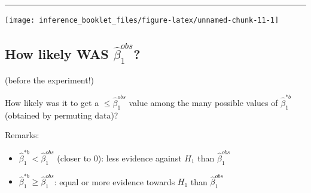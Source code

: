 \documentclass[]{article}
\newenvironment{Shaded}{\begin{snugshade}}{\end{snugshade}}
\newcommand{\KeywordTok}[1]{\textcolor[rgb]{0.13,0.29,0.53}{\textbf{#1}}}
\newcommand{\DataTypeTok}[1]{\textcolor[rgb]{0.13,0.29,0.53}{#1}}
\newcommand{\DecValTok}[1]{\textcolor[rgb]{0.00,0.00,0.81}{#1}}
\newcommand{\StringTok}[1]{\textcolor[rgb]{0.31,0.60,0.02}{#1}}
\newcommand{\CommentTok}[1]{\textcolor[rgb]{0.56,0.35,0.01}{\textit{#1}}}
\newcommand{\ControlFlowTok}[1]{\textcolor[rgb]{0.13,0.29,0.53}{\textbf{#1}}}
\newcommand{\OperatorTok}[1]{\textcolor[rgb]{0.81,0.36,0.00}{\textbf{#1}}}
\newcommand{\NormalTok}[1]{#1}
\providecommand{\tightlist}{%
  \setlength{\itemsep}{0pt}\setlength{\parskip}{0pt}}
\begin{document}
\begin{Shaded}
\end{Shaded}

\begin{center}\rule{0.5\linewidth}{\linethickness}\end{center}

\begin{center}\texttt{[image: inference\_booklet\_files/figure-latex/unnamed-chunk-11-1]} \end{center}

\subsection{\texorpdfstring{How likely WAS
\(\hat{\beta}_1 ^{obs}\)?}{How likely WAS \textbackslash{}hat\{\textbackslash{}beta\}\_1 \^{}\{obs\}?}}\label{how-likely-was-hatbeta_1-obs}

(before the experiment!)

How likely was it to get a \(\leq \hat{\beta}_1 ^{obs}\) value among the
many possible values of \(\hat{\beta}_1 ^{*b}\) (obtained by permuting
data)?

Remarks:

\begin{itemize}
\tightlist
\item
  \(\hat{\beta}_1 ^{* b}< \hat{\beta}_1 ^{obs}\) (closer to 0): less
  evidence against \(H_1\) than \(\hat{\beta}_1 ^{obs}\)
\item
  \(\hat{\beta}_1 ^{* b} \geq \hat{\beta}_1 ^{obs}\): equal or more
  evidence towards \(H_1\) than \(\hat{\beta}_1 ^{obs}\)
\end{itemize}
\end{document}

